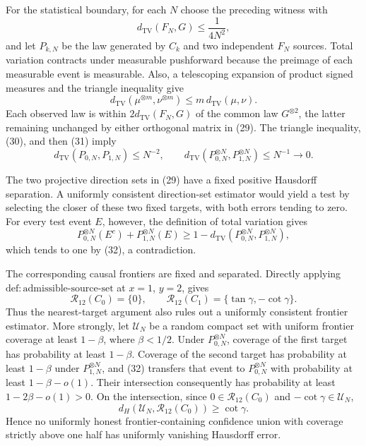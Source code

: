 For the statistical boundary, for each \(N\) choose the preceding witness with
\[
 d_{\mathrm{TV}}(F_N,G)\le\frac{1}{4N^2}, \tag{30}
\]
and let \(P_{k,N}\) be the law generated by \(C_k\) and two independent \(F_N\) sources. Total variation contracts under measurable pushforward because the preimage of each measurable event is measurable. Also, a telescoping expansion of product signed measures and the triangle inequality give
\[
 d_{\mathrm{TV}}(\mu^{\otimes m},\nu^{\otimes m})
 \le m\,d_{\mathrm{TV}}(\mu,\nu). \tag{31}
\]
Each observed law is within \(2d_{\mathrm{TV}}(F_N,G)\) of the common law \(G^{\otimes2}\), the latter remaining unchanged by either orthogonal matrix in (29). The triangle inequality, (30), and then (31) imply
\[
 d_{\mathrm{TV}}(P_{0,N},P_{1,N})\le N^{-2},
 \qquad
 d_{\mathrm{TV}}(P_{0,N}^{\otimes N},P_{1,N}^{\otimes N})\le N^{-1}\longrightarrow0. \tag{32}
\]

The two projective direction sets in (29) have a fixed positive Hausdorff separation. A uniformly consistent direction-set estimator would yield a test by selecting the closer of these two fixed targets, with both errors tending to zero. For every test event \(E\), however, the definition of total variation gives
\[
 P_{0,N}^{\otimes N}(E^c)+P_{1,N}^{\otimes N}(E)
 \ge1-d_{\mathrm{TV}}(P_{0,N}^{\otimes N},P_{1,N}^{\otimes N}), \tag{33}
\]
which tends to one by (32), a contradiction.

The corresponding causal frontiers are fixed and separated. Directly applying \(\mathrm{def:admissible\text{-}source\text{-}set}\) at \(x=1\), \(y=2\), gives
\[
 \mathcal R_{12}(C_0)=\{0\},
 \qquad
 \mathcal R_{12}(C_1)=\{\tan\gamma,-\cot\gamma\}. \tag{34}
\]
Thus the nearest-target argument also rules out a uniformly consistent frontier estimator. More strongly, let \(\mathcal U_N\) be a random compact set with uniform frontier coverage at least \(1-\beta\), where \(\beta<1/2\). Under \(P_{0,N}^{\otimes N}\), coverage of the first target has probability at least \(1-\beta\). Coverage of the second target has probability at least \(1-\beta\) under \(P_{1,N}^{\otimes N}\), and (32) transfers that event to \(P_{0,N}^{\otimes N}\) with probability at least \(1-\beta-o(1)\). Their intersection consequently has probability at least \(1-2\beta-o(1)>0\). On the intersection, since \(0\in\mathcal R_{12}(C_0)\) and \(-\cot\gamma\in\mathcal U_N\),
\[
 d_H(\mathcal U_N,\mathcal R_{12}(C_0))\ge\cot\gamma. \tag{35}
\]
Hence no uniformly honest frontier-containing confidence union with coverage strictly above one half has uniformly vanishing Hausdorff error.

